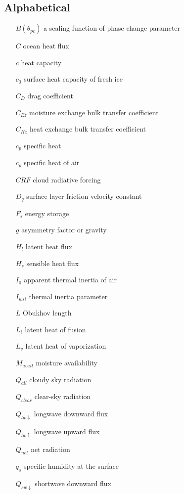 \subsection{Alphabetical}
\begin{enumerate}
   \item[$B(\theta_{pc})$] a scaling function of phase change parameter
    \item[$C$] ocean heat flux
    \item[$c$] heat capacity
    \item[$c_{0}$] surface heat capacity of fresh ice
    \item[$C_{D}$] drag coefficient
    \item[$C_{Ez}$] moisture exchange bulk transfer coefficient
    \item[$C_{Hz}$] heat exchange bulk transfer coefficient
    \item[$c_{p}$] specific heat
    \item[$c_{p}$] specific heat of air
    \item[$CRF$] cloud radiative forcing
    \item[$D_{q}$] surface layer friction velocity constant
    \item[$F_{s}$] energy storage
    \item[$g$] asymmetry factor or gravity
    \item[$H_{l}$] latent heat flux
    \item[$H_{s}$] sensible heat flux
    \item[$I_{0}$] apparent thermal inertia of air 
    \item[$I_{wsi}$] thermal inertia parameter
    \item[$L$] Obukhov length
    \item[$L_{i}$] latent heat of fusion
    \item[$L_{v}$] latent heat of vaporization
    \item[$M_{avail}$] moisture availability
    \item[$Q_{all}$] cloudy sky radiation
    \item[$Q_{clear}$] clear-sky radiation
    \item[$Q_{lw \downarrow}$] longwave downward flux
    \item[$Q_{lw \uparrow}$] longwave upward flux
    \item[$Q_{net}$] net radiation
    \item[$q_{s}$] specific humidity at the surface
    \item[$Q_{sw \downarrow}$] shortwave downward flux

\end{enumerate}
